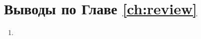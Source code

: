 
\section{Выводы по Главе \ref{ch:review}}
\label{sec:review.conclude}

\begin{enumerate}
  \item
\end{enumerate}

